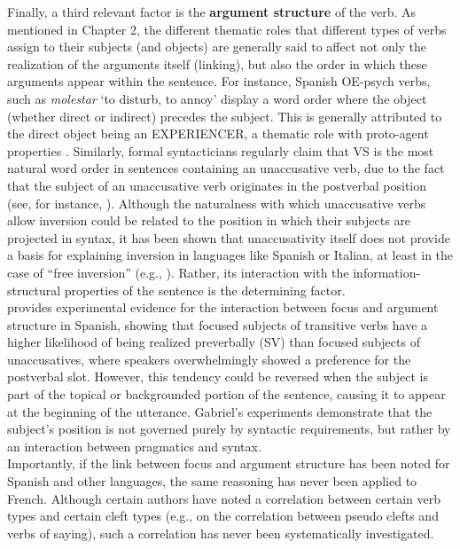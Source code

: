Finally, a third relevant factor is the \textbf{argument structure} of the verb. As mentioned in Chapter 2, the different thematic roles that different types of verbs assign to their subjects (and objects) are generally said to affect not only the realization of the arguments itself (linking), but also the order in which these arguments appear within the sentence. For instance, Spanish OE-psych verbs, such as \textit{molestar} `to disturb, to annoy' display a word order where the object (whether direct or indirect) precedes the subject. This is generally attributed to the direct object being an {\selectfont EXPERIENCER}, a thematic role with proto-agent properties \parencite{dowty1991thematic}. Similarly, formal syntacticians regularly claim that VS is the most natural  word  order in sentences containing an unaccusative verb, due to the fact that the subject of an unaccusative verb originates in the postverbal  position (see, for instance, \cite{burzio1986italian, rizzi1982issues, belletti1988case}). Although the naturalness with which unaccusative verbs allow inversion could be related to the position in which their subjects are projected in syntax, it has been shown that unaccusativity itself does not provide a basis for explaining  inversion in languages like Spanish or Italian, at least in the case of ``free inversion'' (e.g., \cite{leonetti2018two}). Rather, its interaction with the information-structural properties of the sentence is the determining factor. \\
\textcite{gabriel2007fokus} provides experimental evidence for the interaction between focus and argument structure in Spanish, showing that focused subjects of transitive verbs have a higher likelihood of being realized preverbally (SV) than focused subjects of unaccusatives, where speakers overwhelmingly showed a preference for the postverbal slot. However, this tendency could be reversed when the subject is part of the topical or backgrounded portion of the sentence, causing it to appear at the beginning of the utterance. Gabriel's experiments demonstrate that the subject's position is not governed purely by syntactic requirements, but rather by an interaction between pragmatics and syntax. \\
Importantly, if the link between focus and argument structure has been noted for Spanish and other languages, the same reasoning has never been applied to French. Although certain authors have noted a correlation between certain verb types and certain cleft types (e.g., \cite{apotheloz2012pseudo} on the correlation between pseudo clefts and verbs of saying), such a correlation has never been systematically investigated.\\

